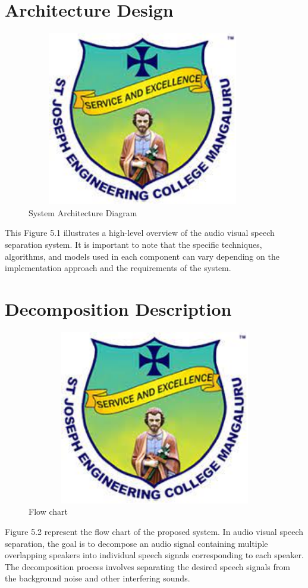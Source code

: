 \documentclass[12pt,a4paper]{report}
\begin{document}
\section{Architecture Design}
\begin{figure}[hbtp]
\centering
\includegraphics[width=4in,height=3in]{./pic/sjeclogo.png}
\caption{System Architecture Diagram}
\end{figure}
This Figure 5.1 illustrates a high-level overview of the audio visual speech separation system. It is important to note that the specific techniques, algorithms, and models used in each component can vary depending on the implementation approach and the requirements of the system.
\section{Decomposition Description}
\begin{figure}[hbtp]
\centering
\includegraphics[width=5in,height=3in]{./pic/sjeclogo.png}
\caption{Flow chart}
\end{figure}
\newpage
Figure 5.2 represent the flow chart of the proposed system. In audio visual speech separation, the goal is to decompose an audio signal containing multiple overlapping speakers into individual speech signals corresponding to each speaker. The decomposition process involves separating the desired speech signals from the background noise and other interfering sounds.
\end{document}
